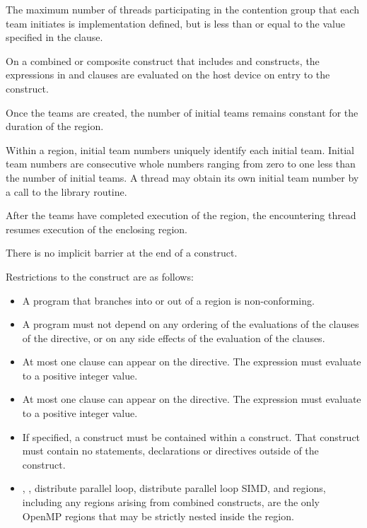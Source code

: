 The maximum number of threads participating in the contention group that each team
initiates is implementation defined, but is less than or equal to the value specified in the
 clause.

On a combined or composite construct that includes  and
 constructs, the expressions in  and
 clauses are evaluated on the host device on
entry to the  construct.

Once the teams are created, the number of initial teams remains constant for the duration of the
 region.

Within a  region, initial team numbers uniquely identify each
initial team. Initial team numbers are
consecutive whole numbers ranging from zero to one less than the number of
initial teams. A
thread may obtain its own initial team number by a call to the  library
routine.

After the teams have completed execution of the  region, the encountering thread
resumes execution of the enclosing  region.

There is no implicit barrier at the end of a  construct.

\restrictions
Restrictions to the  construct are as follows:

\begin{itemize}
\item A program that branches into or out of a  region is non-conforming.

\item A program must not depend on any ordering of the evaluations of the clauses of the
 directive, or on any side effects of the evaluation of the clauses.

\item At most one  clause can appear on the directive. The
 expression must evaluate to a positive integer value.

\item At most one  clause can appear on the directive. The 
expression must evaluate to a positive integer value.

\item If specified, a  construct must be contained within a  construct. That  construct must contain no statements, declarations or directives outside of the  construct.

\item {}, , distribute parallel loop,
distribute parallel loop SIMD, and  regions, including any
 regions arising from combined constructs, are the only OpenMP regions
that may be strictly nested inside the  region.

\end{itemize}

